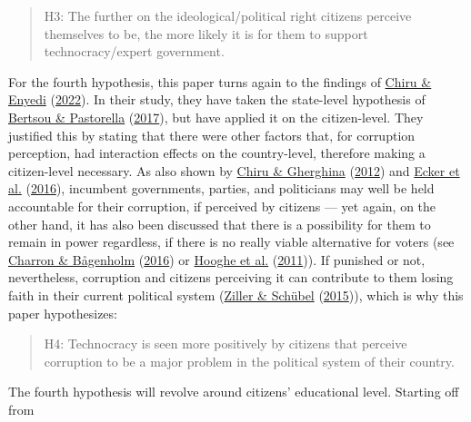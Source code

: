 \documentclass[
  12pt,
  english,
]{article}
\begin{document}
\begin{quote}
H3: The further on the ideological/political right citizens perceive
themselves to be, the more likely it is for them to support
technocracy/expert government.
\end{quote}

For the fourth hypothesis, this paper turns again to the findings of
\protect\hyperlink{ref-chiru2022wants}{Chiru \& Enyedi}
(\protect\hyperlink{ref-chiru2022wants}{2022}). In their study, they
have taken the state-level hypothesis of
\protect\hyperlink{ref-bertsou2017technocratic}{Bertsou \& Pastorella}
(\protect\hyperlink{ref-bertsou2017technocratic}{2017}), but have
applied it on the citizen-level. They justified this by stating that
there were other factors that, for corruption perception, had
interaction effects on the country-level, therefore making a
citizen-level necessary. As also shown by
\protect\hyperlink{ref-chiru2012voter}{Chiru \& Gherghina}
(\protect\hyperlink{ref-chiru2012voter}{2012}) and
\protect\hyperlink{ref-ecker2016corruption}{Ecker et al.}
(\protect\hyperlink{ref-ecker2016corruption}{2016}), incumbent
governments, parties, and politicians may well be held accountable for
their corruption, if perceived by citizens --- yet again, on the other
hand, it has also been discussed that there is a possibility for them to
remain in power regardless, if there is no really viable alternative for
voters (see \protect\hyperlink{ref-charron2016ideology}{Charron \&
Bågenholm} (\protect\hyperlink{ref-charron2016ideology}{2016}) or
\protect\hyperlink{ref-hooghe2011distrusting}{Hooghe et al.}
(\protect\hyperlink{ref-hooghe2011distrusting}{2011})). If punished or
not, nevertheless, corruption and citizens perceiving it can contribute
to them losing faith in their current political system
(\protect\hyperlink{ref-ziller2015pure}{Ziller \& Schübel}
(\protect\hyperlink{ref-ziller2015pure}{2015})), which is why this paper
hypothesizes:

\begin{quote}
H4: Technocracy is seen more positively by citizens that perceive
corruption to be a major problem in the political system of their
country.
\end{quote}

The fourth hypothesis will revolve around citizens' educational level.
Starting off from
\end{document}
